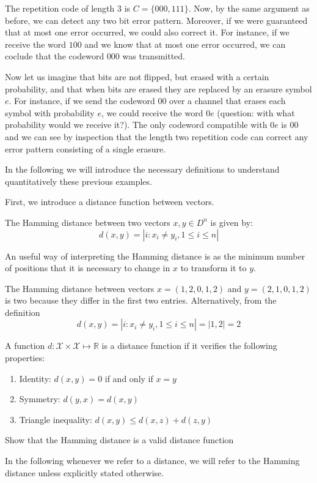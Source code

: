 The repetition code of length $3$ is $C=\{000,111\}$. Now, by the same argument as before, we can detect any two bit error pattern. Moreover, if we were guaranteed that at most one error occurred, we could also correct it. For instance, if we receive the word $100$ and we know that at most one error occurred, we can coclude that the codeword $000$ was transmitted.

Now let us imagine that bits are not flipped, but erased with a certain probability, and that when bits are erased they are replaced by an erasure symbol $e$. For instance, if we send the codeword $00$ over a channel that erases each symbol with probability $e$, we could receive the word $0e$ (question: with what probability would we receive it?). The only codeword compatible with $0e$ is $00$ and we can see by inspection that the length two repetition code can correct any error pattern consisting of a single erasure.

In the following we will introduce the necessary definitions to understand quantitatively these previous examples. 

First, we introduce a distance function between vectors.
\begin{definition}
The Hamming distance between two vectors $x,y\in D^n$ is given by:
\begin{equation}
d(x,y)=|{i:x_i\neq y_i, 1\leq i\leq n}|
\end{equation}
\end{definition}
An useful way of interpreting the Hamming distance is as the minimum number of positions that it is necessary to change in $x$ to transform it to $y$.
\begin{example}
The Hamming distance between vectors $x=(1,2,0,1,2)$ and $y=(2,1,0,1,2)$ is two because they differ in the first two entries. Alternatively, from the definition
\begin{equation}
d(x,y)=|{i:x_i\neq y_i, 1\leq i\leq n}|=|{1,2}|=2
\end{equation}\end{example}
A function $d:\mathcal X\times \mathcal X\mapsto \mathbb R$ is a distance function if it verifies the following properties:
\begin{enumerate}
\item Identity: $d(x,y)=0$ if and only if $x=y$
\item Symmetry: $d(y,x)=d(x,y)$
\item Triangle inequality: $d(x,y)\leq d(x,z)+d(z,y)$
\end{enumerate}
\begin{exercise}
Show that the Hamming distance is a valid distance function
\end{exercise}
In the following whenever we refer to a distance, we will refer to the Hamming distance unless explicitly stated otherwise.

